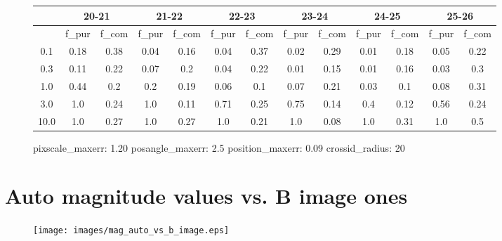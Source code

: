 \documentclass{article}
\begin{document}
\begin{figure}[H]
\centering
\begin{tabular}{|c|c|c|c|c|c|c|c|c|c|c|c|c|}
\hline
\multicolumn{1}{|c|}{} & \multicolumn{2}{|c|}{20-21} & \multicolumn{2}{|c|}{21-22} & \multicolumn{2}{|c|}{22-23} & \multicolumn{2}{|c|}{23-24} & \multicolumn{2}{|c|}{24-25} & \multicolumn{2}{|c|}{25-26}\\
\hline \hline
 & f\_pur & f\_com & f\_pur & f\_com & f\_pur & f\_com & f\_pur & f\_com & f\_pur & f\_com & f\_pur & f\_com \\
\hline
0.1 & 0.18 & 0.38 & 0.04 & 0.16 & 0.04 & 0.37 & 0.02 & 0.29 & 0.01 & 0.18 & 0.05 & 0.22\\
\hline
0.3 & 0.11 & 0.22 & 0.07 & 0.2 & 0.04 & 0.22 & 0.01 & 0.15 & 0.01 & 0.16 & 0.03 & 0.3\\
\hline
1.0 & 0.44 & 0.2 & 0.2 & 0.19 & 0.06 & 0.1 & 0.07 & 0.21 & 0.03 & 0.1 & 0.08 & 0.31\\
\hline
3.0 & 1.0 & 0.24 & 1.0 & 0.11 & 0.71 & 0.25 & 0.75 & 0.14 & 0.4 & 0.12 & 0.56 & 0.24\\
\hline
10.0 & 1.0 & 0.27 & 1.0 & 0.27 & 1.0 & 0.21 & 1.0 & 0.08 & 1.0 & 0.31 & 1.0 & 0.5\\
\hline
\end{tabular}
\caption{pixscale\_maxerr: 1.20 posangle\_maxerr: 2.5 position\_maxerr: 0.09 crossid\_radius: 20}
\end{figure}

\newpage\null\newpage

\section{Auto magnitude values vs. B image ones}
\begin{figure}[H]
\centering
\texttt{[image: images/mag\_auto\_vs\_b\_image.eps]}
\end{figure}
\end{document}
